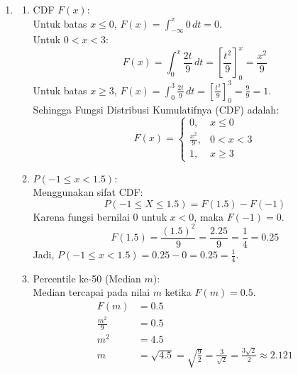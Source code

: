 \documentclass[12pt,a4paper]{article}
\begin{document}
\begin{enumerate}
  \item \begin{enumerate}
          \item CDF $F(x)$: \\
                Untuk batas $x \le 0$, $F(x) = \int_{-\infty}^{x} 0 \,dt = 0$. \\
                Untuk $0 < x < 3$:
                \[
                  F(x) = \int_{0}^{x} \frac{2t}{9} \,dt = \left[ \frac{t^2}{9} \right]_0^x = \frac{x^2}{9}
                \]
                Untuk batas $x \ge 3$, $F(x) = \int_{0}^{3} \frac{2t}{9} \,dt = \left[ \frac{t^2}{9} \right]_0^3 = \frac{9}{9} = 1$. \\
                Sehingga Fungsi Distribusi Kumulatifnya (CDF) adalah:
                \[
                  F(x) = \begin{cases}
                    0,             & x \le 0   \\
                    \frac{x^2}{9}, & 0 < x < 3 \\
                    1,             & x \ge 3
                  \end{cases}
                \]

          \item $P(-1 \le x < 1.5)$: \\
                Menggunakan sifat CDF:
                \[
                  P(-1 \le X \le 1.5) = F(1.5) - F(-1)
                \]
                Karena fungsi bernilai $0$ untuk $x < 0$, maka $F(-1) = 0$.
                \[
                  F(1.5) = \frac{(1.5)^2}{9} = \frac{2.25}{9} = \frac{1}{4} = 0.25
                \]
                Jadi, $P(-1 \le x < 1.5) = 0.25 - 0 = 0.25 = \frac{1}{4}$.

          \item Percentile ke-50 (Median $m$): \\
                Median tercapai pada nilai $m$ ketika $F(m) = 0.5$.
                \begin{align*}
                  F(m)          & = 0.5                                                                                      \\
                  \frac{m^2}{9} & = 0.5                                                                                      \\
                  m^2           & = 4.5                                                                                      \\
                  m             & = \sqrt{4.5} = \sqrt{\frac{9}{2}} = \frac{3}{\sqrt{2}} = \frac{3\sqrt{2}}{2} \approx 2.121
                \end{align*}
        \end{enumerate}


\end{enumerate}
\end{document}
